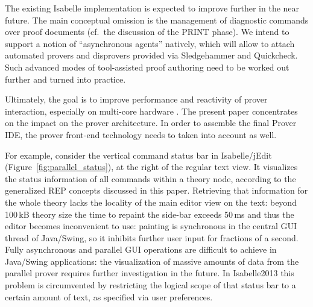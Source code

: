 \begin{isabellebody}
\begin{isamarkuptext}
  The existing Isabelle implementation is expected to improve further
  in the near future.  The main conceptual omission is the management
  of diagnostic commands over proof documents (cf.\ the discussion of
  the PRINT phase).  We intend to support a notion of ``asynchronous
  agents'' natively, which will allow to attach automated provers and
  disprovers provided via Sledgehammer and Quickcheck.  Such advanced
  modes of tool-assisted proof authoring need to be worked out
  further and turned into practice.

  \medskip Ultimately, the goal is to improve performance and
  reactivity of prover interaction, especially on multi-core hardware
  \cite{CICM:2013:Paral-ITP}.  The present paper concentrates on the
  impact on the prover architecture.  In order to assemble the final
  Prover IDE, the prover front-end technology needs to taken into
  account as well.

  For example, consider the vertical command status bar in
  Isabelle/jEdit (Figure~\ref{fig:parallel_status}), at the right of
  the regular text view.  It visualizes the status information of all
  commands within a theory node, according to the generalized REP
  concepts discussed in this paper.  Retrieving that information for
  the whole theory lacks the locality of the main editor view on the
  text: beyond 100\,kB theory size the time to repaint the side-bar
  exceeds 50\,ms and thus the editor becomes inconvenient to use:
  painting is synchronous in the central GUI thread of Java/Swing, so
  it inhibits further user input for fractions of a second.  Fully
  asynchronous and parallel GUI operations are difficult to achieve in
  Java/Swing applications: the visualization of massive amounts of
  data from the parallel prover requires further investigation in the
  future.  In Isabelle2013 this problem is circumvented by
  restricting the logical scope of that status bar to a certain
  amount of text, as specified via user preferences.%
\end{isamarkuptext}%
\isamarkuptrue%
%
\isadelimtheory
%
\endisadelimtheory
%
\isatagtheory
{}\isamarkupfalse%
%
\endisatagtheory
{\isafoldtheory}%
%
\isadelimtheory
%
\endisadelimtheory
\isanewline
\end{isabellebody}%
